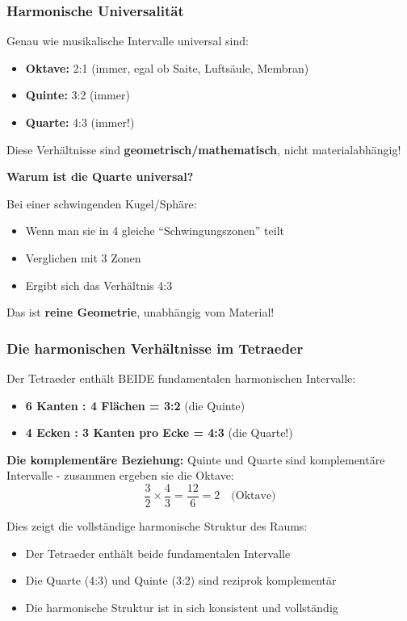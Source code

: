 \documentclass[12pt,a4paper]{article}
\begin{document}
	\subsubsection{Harmonische Universalität}
	\label{subsubsec:harmonische_universalitaet}
	
	Genau wie musikalische Intervalle universal sind:
	\begin{itemize}
		\item \textbf{Oktave:} 2:1 (immer, egal ob Saite, Luftsäule, Membran)
		\item \textbf{Quinte:} 3:2 (immer)
		\item \textbf{Quarte:} 4:3 (immer!)
	\end{itemize}
	
	Diese Verhältnisse sind \textbf{geometrisch/mathematisch}, nicht materialabhängig!
	
	\textbf{Warum ist die Quarte universal?}
	
	Bei einer schwingenden Kugel/Sphäre:
	\begin{itemize}
		\item Wenn man sie in 4 gleiche ``Schwingungszonen'' teilt
		\item Verglichen mit 3 Zonen
		\item Ergibt sich das Verhältnis 4:3
	\end{itemize}
	
	Das ist \textbf{reine Geometrie}, unabhängig vom Material!
	
	\subsubsection{Die harmonischen Verhältnisse im Tetraeder}
	\label{subsubsec:tetraeder_harmonik}
	
	Der Tetraeder enthält BEIDE fundamentalen harmonischen Intervalle:
	\begin{itemize}
		\item \textbf{6 Kanten : 4 Flächen = 3:2} (die Quinte)
		\item \textbf{4 Ecken : 3 Kanten pro Ecke = 4:3} (die Quarte!)
	\end{itemize}
	
	\textbf{Die komplementäre Beziehung:}
	Quinte und Quarte sind komplementäre Intervalle - zusammen ergeben sie die Oktave:
	\begin{equation}
		\frac{3}{2} \times \frac{4}{3} = \frac{12}{6} = 2 \quad \text{(Oktave)}
	\end{equation}
	
	Dies zeigt die vollständige harmonische Struktur des Raums:
	\begin{itemize}
		\item Der Tetraeder enthält beide fundamentalen Intervalle
		\item Die Quarte (4:3) und Quinte (3:2) sind reziprok komplementär
		\item Die harmonische Struktur ist in sich konsistent und vollständig
	\end{itemize}
	
\end{document}
